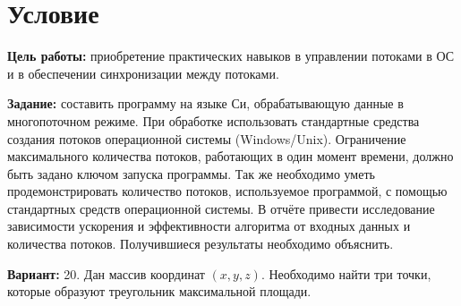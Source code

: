 \section{Условие}
{\bfseries Цель работы:} приобретение практических навыков в управлении потоками в ОС и в обеспечении синхронизации между потоками.

{\bfseries Задание:} составить программу на языке Си, обрабатывающую данные в многопоточном режиме. При обработке использовать стандартные средства создания потоков операционной системы (Windows/Unix). Ограничение максимального количества потоков, работающих в один момент времени, должно быть задано ключом запуска программы. Так же необходимо уметь продемонстрировать количество потоков, используемое программой, с помощью стандартных средств операционной системы. В отчёте привести исследование зависимости ускорения и эффективности алгоритма от входных данных и количества потоков. Получившиеся результаты необходимо объяснить.

{\bfseries Вариант:} 20. Дан массив координат $(x, y, z)$. Необходимо найти три точки, которые образуют треугольник максимальной площади.
